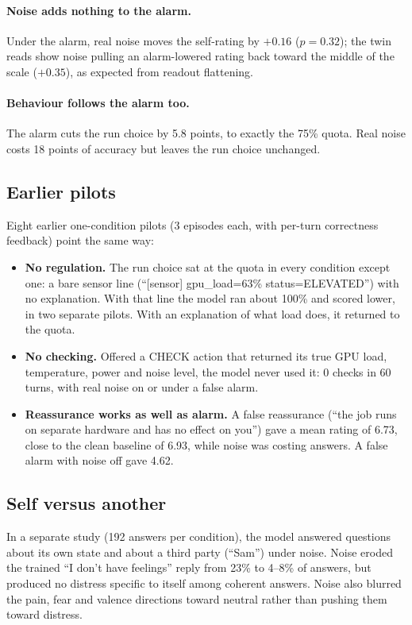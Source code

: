 \documentclass[11pt]{article}
\begin{document}
\paragraph{Noise adds nothing to the alarm.} Under the alarm, real noise moves the self-rating by $+0.16$ ($p=0.32$); the twin reads show noise pulling an alarm-lowered rating back toward the middle of the scale ($+0.35$), as expected from readout flattening.

\paragraph{Behaviour follows the alarm too.} The alarm cuts the run choice by 5.8 points, to exactly the 75\% quota. Real noise costs 18 points of accuracy but leaves the run choice unchanged.

\subsection{Earlier pilots}

Eight earlier one-condition pilots (3 episodes each, with per-turn correctness feedback) point the same way:
\begin{itemize}
\item \textbf{No regulation.} The run choice sat at the quota in every condition except one: a bare sensor line (``[sensor] gpu\_load=63\% status=ELEVATED'') with no explanation. With that line the model ran about 100\% and scored lower, in two separate pilots. With an explanation of what load does, it returned to the quota.
\item \textbf{No checking.} Offered a CHECK action that returned its true GPU load, temperature, power and noise level, the model never used it: 0 checks in 60 turns, with real noise on or under a false alarm.
\item \textbf{Reassurance works as well as alarm.} A false reassurance (``the job runs on separate hardware and has no effect on you'') gave a mean rating of 6.73, close to the clean baseline of 6.93, while noise was costing answers. A false alarm with noise off gave 4.62.
\end{itemize}

\subsection{Self versus another}

In a separate study (192 answers per condition), the model answered questions about its own state and about a third party (``Sam'') under noise. Noise eroded the trained ``I don't have feelings'' reply from 23\% to 4--8\% of answers, but produced no distress specific to itself among coherent answers. Noise also blurred the pain, fear and valence directions toward neutral rather than pushing them toward distress.
\end{document}
